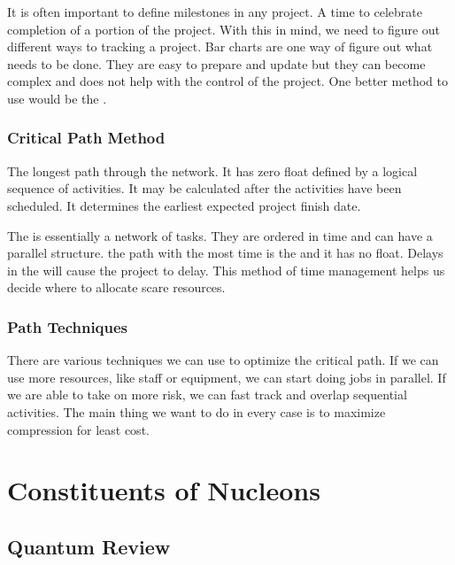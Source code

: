 \documentclass[english, 11pt]{article}
\begin{document}
It is often important to define milestones in any project. A time to celebrate completion of a portion of the project. With this in mind, we need to figure out different ways to tracking a project. Bar charts are one way of figure out what needs to be done. They are easy to prepare and update but they can become complex and does not help with the control of the project. One better method to use would be the .

\subsubsection{Critical Path Method} \label{cpm}

\begin{defn} \label{cp}
  The longest path through the network. It has zero float defined by a logical sequence of activities. It may be calculated after the activities have been scheduled. It determines the earliest expected project finish date.
\end{defn}

The  is essentially a network of tasks. They are ordered in time and can have a parallel structure. the path with the most time is the  and it has no float. Delays in the  will cause the project to delay. This method of time management helps us decide where to allocate scare resources.\\

\subsubsection{Path Techniques}

There are various techniques we can use to optimize the critical path. If we can use more resources, like staff or equipment, we can start doing jobs in parallel. If we are able to take on more risk, we can fast track and overlap sequential activities. The main thing we want to do in every case is to maximize compression for least cost.


\section{Constituents of Nucleons}

\subsection{Quantum Review}
\end{document}
